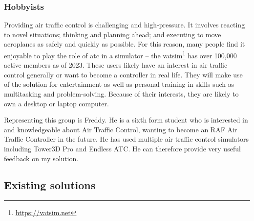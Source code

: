 \documentclass{article}
\begin{document}
\subsubsection{Hobbyists}
Providing air traffic control is challenging and high-pressure.
It involves reacting to novel situations; thinking and planning ahead; and executing to move aeroplanes as safely and quickly as possible\cite{natsbuzz}.
For this reason, many people find it enjoyable to play the role of \acrshort{atc} in a simulator -- the \acrfull{vatsim}\footnote{\url{https://vatsim.net}} has over 100,000 active members as of 2023.
These users likely have an interest in air traffic control generally or want to become a controller in real life.
They will make use of the solution for entertainment as well as personal training in skills such as multitasking and problem-solving.
Because of their interests, they are likely to own a desktop or laptop computer.

Representing this group is Freddy.
He is a sixth form student who is interested in and knowledgeable about Air Traffic Control, wanting to become an RAF Air Traffic Controller in the future.
He has used multiple air traffic control simulators including Tower3D Pro and Endless ATC.
He can therefore provide very useful feedback on my solution.


\subsection{Existing solutions} \label{existingsolutions}
\end{document}
